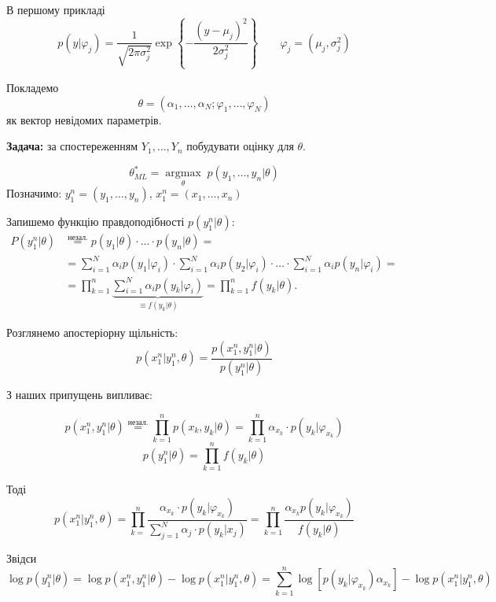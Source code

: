 В першому прикладі
\[ p\left( y | \varphi_j \right) = \frac{1}{\sqrt{2\pi \sigma_j^2}} \exp \left\{ 
- \frac{\left( y - \mu_j \right) ^2}{2\sigma_j^2} \right\} \qquad
\varphi_j = \left( \mu_j, \sigma_j^2 \right)  \] 

Покладемо \[ \theta = \left( \alpha_1, \ldots, \alpha_N; \varphi_1, \ldots, \varphi_N \right) \] 
як вектор невідомих параметрів.

\textbf{Задача:} за спостереженням $Y_1, \ldots, Y_n$ побудувати оцінку для $\theta$. 

\[ \theta_{ML}^{*} = \underset{\theta}{\operatorname{argmax}} \; p\left( y_1, \ldots, y_n | \theta \right)  \] 
Позначимо: $y_1^{n} = \left( y_1, \ldots, y_n \right)$, $x_1^{n} = \left( x_1, \ldots, x_n \right) $

Запишемо функцію правдоподібності $p(y_1^{n}|\theta)$:
\begin{align*}
  P\left( y_1^{n} | \theta \right) &\overset{\text{незал.}}{=} p(y_1|\theta) \cdot \ldots \cdot
  p(y_n|\theta) = \\ 
     &= \sum_{i=1}^{N} \alpha_i p(y_1|\varphi_i) \cdot \sum_{i=1}^{N} \alpha_i
     p(y_2|\varphi_i) \cdot \ldots \cdot \sum_{i=1}^{N} \alpha_i
     p(y_n|\varphi_i) = \\ 
     &= \prod_{k=1}^{n} \underbrace{\sum_{i=1}^{N} \alpha_i p(y_k|\varphi_i)}_{
     \equiv f(y_k|\theta)} = \prod_{k=1}^{n} f(y_k|\theta) 
.\end{align*}

Розглянемо апостеріорну щільність:
\[ p(x_1^{n} | y_1^{n}, \theta) = \frac{p\left( x_1^{n}, y_1^{n} | \theta \right) }{
p\left( y_1^{n}| \theta \right) } \] 

З наших припущень випливає:

\[ p\left( x_1^{n}, y_1^{n} | \theta \right) \overset{\text{незал.}}{=}
\prod_{k=1}^{n} p\left( x_k, y_k | \theta \right) = \prod_{k=1}^{n} \alpha_{x_k} \cdot
p\left( y_k | \varphi_{x_k} \right) \] 
\[ p\left( y_1^{n} | \theta \right) = \prod_{k=1}^{n} f(y_k | \theta)  \] 

Тоді
\[ p\left( x_1^{n} | y_1^{n}, \theta \right) = 
\prod_{k=}^{n} \frac{\alpha_{x_k} \cdot p\left( y_k | \varphi_{x_k} \right) }{
\sum_{j=1}^{N} \alpha_j \cdot p(y_k | x_j)} = 
\prod_{k=1}^{n} \frac{\alpha_{x_k}p(y_k | \varphi_{x_k})}{f(y_k | \theta)} \] 

Звідси
\begin{equation} \label{eq:3}
  \log p(y_1^{n} | \theta) = \log p(x_1^{n}, y_1^{n} | \theta) - \log p(x_1^{n} | y_1^{n}, \theta) = 
  \sum_{k=1}^{n} \log \left[ p(y_k | \varphi_{x_k}) \alpha_{x_k} \right] - 
  \log p(x_1^{n} | y_1^{n}, \theta)
\end{equation}


